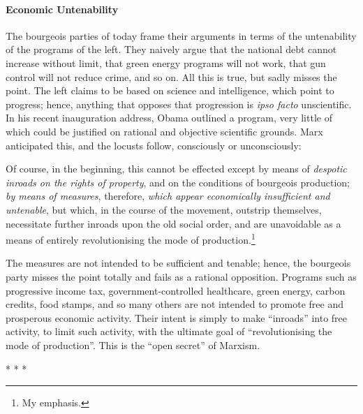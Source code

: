 \paragraph{Economic Untenability}


The bourgeois parties of today frame their arguments in terms of the untenability of the programs of the left. They naively argue that the national debt cannot increase without limit, that green energy programs will not work, that gun control will not reduce crime, and so on. All this is true, but sadly misses the point. The left claims to be based on science and intelligence, which point to progress; hence, anything that opposes that progression is \emph{ipso facto} unscientific. In his recent inauguration address, Obama outlined a program, very little of which could be justified on rational and objective scientific grounds. Marx anticipated this, and the locusts follow, consciously or unconsciously:

\begin{quotex}
Of course, in the beginning, this cannot be effected except by means of \emph{despotic inroads on the rights of property}, and on the conditions of bourgeois production; \emph{by means of measures}, therefore, \emph{which appear economically insufficient and untenable}, but which, in the course of the movement, outstrip themselves, necessitate further inroads upon the old social order, and are unavoidable as a means of entirely revolutionising the mode of production.\footnote{My emphasis.}
\end{quotex}


The measures are not intended to be sufficient and tenable; hence, the bourgeois party misses the point totally and fails as a rational opposition. Programs such as progressive income tax, government-controlled healthcare, green energy, carbon credits, food stamps, and so many others are not intended to promote free and prosperous economic activity. Their intent is simply to make ``inroads'' into free activity, to limit such activity, with the ultimate goal of ``revolutionising the mode of production''. This is the ``open secret'' of Marxism.



\begin{center}* * *\end{center}

